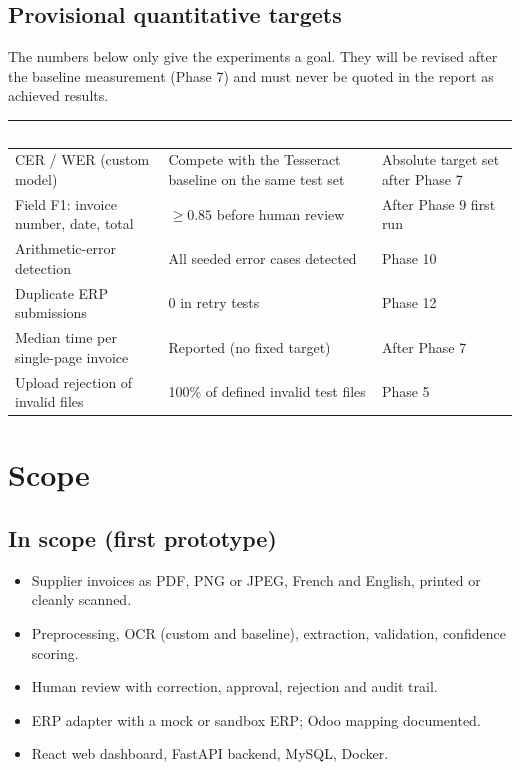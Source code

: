 \documentclass[11pt,a4paper]{report}
\newcommand{\hdr}[1]{\textcolor{white}{\sffamily\bfseries #1}}
\newcommand{\tblstart}{\rowcolors{2}{white}{rowgray}\arrayrulecolor{teal!60}}
\newcommand{\hdrrow}{\rowcolor{navy}}
\begin{document}
\section{Provisional quantitative targets}
\label{sec:targets}
\begin{warnbox}
The numbers below only give the experiments a goal. They will be revised after the baseline measurement (Phase 7) and must never be quoted in the report as achieved results.
\end{warnbox}
{\tblstart\small
\begin{longtable}{L{4.6cm}L{4.4cm}L{4.8cm}}
\hdrrow \hdr{Metric} & \hdr{Provisional target} & \hdr{Revision point}\\ \endhead
CER / WER (custom model) & Compete with the Tesseract baseline on the same test set & Absolute target set after Phase 7\\
Field F1: invoice number, date, total & $\geq 0.85$ before human review & After Phase 9 first run\\
Arithmetic-error detection & All seeded error cases detected & Phase 10\\
Duplicate ERP submissions & 0 in retry tests & Phase 12\\
Median time per single-page invoice & Reported (no fixed target) & After Phase 7\\
Upload rejection of invalid files & 100\% of defined invalid test files & Phase 5\\
\hline
\end{longtable}}

\chapter{Scope}
\section{In scope (first prototype)}
\begin{itemize}
\item Supplier invoices as PDF, PNG or JPEG, French and English, printed or cleanly scanned.
\item Preprocessing, OCR (custom and baseline), extraction, validation, confidence scoring.
\item Human review with correction, approval, rejection and audit trail.
\item ERP adapter with a mock or sandbox ERP; Odoo mapping documented.
\item React web dashboard, FastAPI backend, MySQL, Docker.
\end{itemize}
\end{document}
